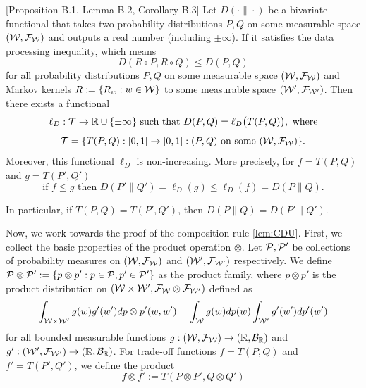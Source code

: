 \begin{lemma} \citet{dong2022gaussian}[Proposition B.1, Lemma B.2, Corollary B.3]
\label{prop:data-processing-functional}
 Let \(D(\cdot\|\cdot)\) be a bivariate functional  that takes two probability distributions $P,Q$ on some measurable space $(\mathcal{W},\mathcal{F}_{\mathcal{W}})$ and outputs a real number (including $\pm \infty$). If it satisfies the data processing inequality, which means
\begin{equation} \label{eq:DPI}
    D(R\circ P, R \circ Q) \leq D(P,Q)
\end{equation}
for all probability distributions $P,Q$ on some measurable space $(\mathcal{W}, \mathcal{F}_{\mathcal{W}})$ and Markov kernels $R:=\{R_w:w \in \mathcal{W}\}$ to some measurable space $(\mathcal{W}', \mathcal{F}_{\mathcal{W}'})$. Then  there exists
a functional
\begin{equation}
    \ell_D:\mathcal{T} \to \mathbb R \cup \{\pm \infty\} \text{ such that }
    D(P, Q)=\ell_D\bigl(T(P,Q)\bigr), \text{ where} 
\end{equation}
\begin{equation}
    \mathcal{T}= \{T(P,Q): [0,1] \to [0,1]:  (P,Q) \text{ on some } (\mathcal{W},\mathcal{F}_{\mathcal{W}})\}.
\end{equation}
Moreover, this functional $\ell_D$ is non-increasing. More precisely, for  $f= T(P,Q)$ and $g= T(P',Q') $
\begin{equation}
   \text{if } f \leq g \text{ then } D(P'\|Q') =\ell_D(g)\leq  \ell_D(f) =D(P\|Q).
\end{equation}

In particular, if $T(P,Q)=T(P',Q')$, 
then $ D(P\|Q)=D(P'\|Q')$.
\end{lemma}



Now, we work towards the proof of the composition rule \ref{lem:CDU}.  First, we collect the basic properties of the product operation \(\otimes\). Let $\mathcal{P}, \mathcal{P}'$ be collections of probability measures on $(\mathcal{W}, \mathcal{F}_{\mathcal{W}})$ and $(\mathcal{W}', \mathcal{F}_{\mathcal{W}'})$ respectively. We define  $\mathcal{P}\otimes \mathcal{P}':= \{p \otimes p': p\in \mathcal{P}, p'\in \mathcal{P}'\}$ as the product family, where $p\otimes p'$ is the product distribution on $(\mathcal{W} \times \mathcal{W}', \mathcal{F}_{\mathcal{W}} \otimes \mathcal{F}_{\mathcal{W}'})$ defined as 
\[
\int_{\mathcal{W} \times \mathcal{W}'} g(w) g'(w') dp \otimes p'(w,w')= \int_{\mathcal{W}} g(w) dp(w) \int_{\mathcal{W}'} g'(w') dp'(w')
\]
for all bounded measurable functions $g: (\mathcal{W}, \mathcal{F}_{\mathcal{W}}) \to (\mathbb{R}, \mathcal{B}_{\mathbb{R}})$ and $g': (\mathcal{W}', \mathcal{F}_{\mathcal{W}'}) \to (\mathbb{R}, \mathcal{B}_{\mathbb{R}})$. For trade-off functions $f= T(P,Q)$ and $f'= T(P',Q')$, we define the product  
\begin{equation} \label{eq:TPTOF}
    f\otimes f':= T(P\otimes P', Q\otimes Q')
\end{equation}


